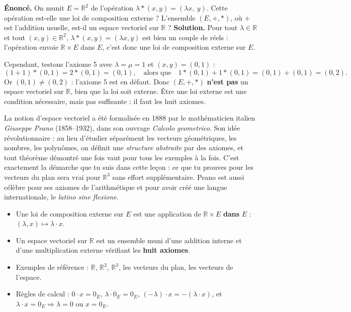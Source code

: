 \documentclass[11pt]{article}
\newcommand{\cle}[1]{{\popxbold\color{popdark}#1}}
\def\star{\mathbin{\ast}}\def\bigstar{\mathord{\ast}}%
\begin{document}
\begin{exoresolu}
\textbf{Énoncé.} On munit $E = \mathbb{R}^2$ de l'opération $\lambda \star (x,y) = (\lambda x,\ y)$. Cette opération est-elle une loi de composition externe ? L'ensemble $(E, +, \star)$, où $+$ est l'addition usuelle, est-il un espace vectoriel sur $\mathbb{R}$ ?
\tcblower
\textbf{Solution.} Pour tout $\lambda \in \mathbb{R}$ et tout $(x,y) \in \mathbb{R}^2$, $\lambda \star (x,y) = (\lambda x, y)$ est bien un couple de réels : l'opération envoie $\mathbb{R} \times E$ dans $E$, c'est donc une loi de composition externe sur $E$.

Cependant, testons l'axiome 5 avec $\lambda = \mu = 1$ et $(x,y) = (0,1)$ :
\[ (1+1) \star (0,1) = 2 \star (0,1) = (0,1), \quad \text{alors que} \quad 1\star(0,1) + 1\star(0,1) = (0,1)+(0,1) = (0,2). \]
Or $(0,1) \neq (0,2)$ : l'axiome 5 est en défaut. Donc $(E, +, \star)$ \textbf{n'est pas} un espace vectoriel sur $\mathbb{R}$, bien que la loi soit externe. Être une loi externe est une condition nécessaire, mais pas suffisante : il faut les huit axiomes.
\end{exoresolu}

\begin{savaistu}
La notion d'espace vectoriel a été formalisée en 1888 par le mathématicien italien \emph{Giuseppe Peano} (1858--1932), dans son ouvrage \emph{Calcolo geometrico}. Son idée révolutionnaire : au lieu d'étudier séparément les vecteurs géométriques, les nombres, les polynômes, on définit une \emph{structure abstraite} par des axiomes, et tout théorème démontré une fois vaut pour tous les exemples à la fois. C'est exactement la démarche que tu suis dans cette leçon : ce que tu prouves pour les vecteurs du plan sera vrai pour $\mathbb{R}^3$ sans effort supplémentaire. Peano est aussi célèbre pour ses axiomes de l'arithmétique et pour avoir créé une langue internationale, le \emph{latino sine flexione}.
\end{savaistu}

\begin{aretenir}
\begin{itemize}
\item Une \cle{loi de composition externe} sur $E$ est une application de $\mathbb{R} \times E$ \textbf{dans} $E$ : $(\lambda, x) \mapsto \lambda \cdot x$.
\item Un \cle{espace vectoriel sur $\mathbb{R}$} est un ensemble muni d'une addition interne et d'une multiplication externe vérifiant les \textbf{huit axiomes}.
\item Exemples de référence : $\mathbb{R}$, $\mathbb{R}^2$, $\mathbb{R}^3$, les vecteurs du plan, les vecteurs de l'espace.
\item Règles de calcul : $0 \cdot x = 0_E$, $\lambda \cdot 0_E = 0_E$, $(-\lambda) \cdot x = -(\lambda \cdot x)$, et $\lambda \cdot x = 0_E \Rightarrow \lambda = 0 \text{ ou } x = 0_E$.
\end{itemize}
\end{aretenir}
\end{document}
